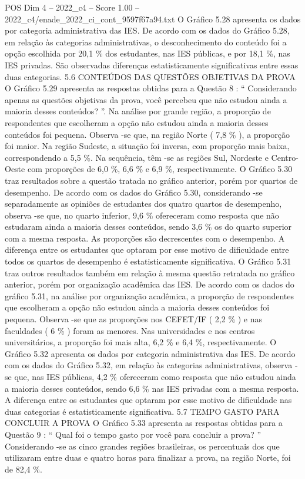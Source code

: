 \begin{textsample}{POS Dim 4 – 2022\_c4 – Score 1.00 – 2022\_c4/enade\_2022\_ci\_cont\_9597f67a94.txt}
O Gráfico 5.28 apresenta os dados por categoria administrativa das IES.
De acordo com os dados do Gráfico 5.28, em relação às categorias administrativas, o desconhecimento do conteúdo foi a opção escolhida por 20,1 \% dos estudantes, nas IES públicas, e por 18,1 \%, nas IES privadas.
São observadas diferenças estatisticamente significativas entre essas duas categorias. 5.6 CONTEÚDOS DAS QUESTÕES OBJETIVAS DA PROVA O Gráfico 5.29 apresenta as respostas obtidas para a Questão 8 : “ Considerando apenas as questões objetivas da prova, você percebeu que não estudou ainda a maioria desses conteúdos? ”.
Na análise por grande região, a proporção de respondentes que escolheram a opção não estudou ainda a maioria desses conteúdos foi pequena.
Observa -se que, na região Norte ( 7,8 \% ), a proporção foi maior.
Na região Sudeste, a situação foi inversa, com proporção mais baixa, correspondendo a 5,5 \%.
Na sequência, têm -se as regiões Sul, Nordeste e Centro-Oeste com proporções de 6,0 \%, 6,6 \% e 6,9 \%, respectivamente.
O Gráfico 5.30 traz resultados sobre a questão tratada no gráfico anterior, porém por quartos de desempenho.
De acordo com os dados do Gráfico 5.30, considerando -se separadamente as opiniões de estudantes dos quatro quartos de desempenho, observa -se que, no quarto inferior, 9,6 \% ofereceram como resposta que não estudaram ainda a maioria desses conteúdos, sendo 3,6 \% os do quarto superior com a mesma resposta.
As proporções são decrescentes com o desempenho.
A diferença entre os estudantes que optaram por esse motivo de dificuldade entre todos os quartos de desempenho é estatisticamente significativa.
O Gráfico 5.31 traz outros resultados também em relação à mesma questão retratada no gráfico anterior, porém por organização acadêmica das IES.
De acordo com os dados do gráfico 5.31, na análise por organização acadêmica, a proporção de respondentes que escolheram a opção não estudou ainda a maioria desses conteúdos foi pequena.
Observa -se que as proporções nos CEFET/IF ( 2,2 \% ) e nas faculdades ( 6 \% ) foram as menores.
Nas universidades e nos centros universitários, a proporção foi mais alta, 6,2 \% e 6,4 \%, respectivamente.
O Gráfico 5.32 apresenta os dados por categoria administrativa das IES.
De acordo com os dados do Gráfico 5.32, em relação às categorias administrativas, observa -se que, nas IES públicas, 4,2 \% ofereceram como resposta que não estudou ainda a maioria desses conteúdos, sendo 6,6 \% nas IES privadas com a mesma resposta.
A diferença entre os estudantes que optaram por esse motivo de dificuldade nas duas categorias é estatisticamente significativa. 5.7 TEMPO GASTO PARA CONCLUIR A PROVA O Gráfico 5.33 apresenta as respostas obtidas para a Questão 9 : “ Qual foi o tempo gasto por você para concluir a prova? ” Considerando -se as cinco grandes regiões brasileiras, os percentuais dos que utilizaram entre duas e quatro horas para finalizar a prova, na região Norte, foi de 82,4 \%.

\end{textsample}
